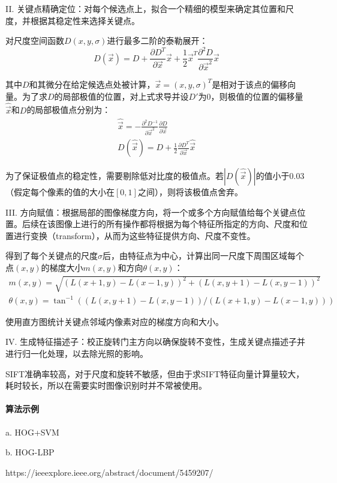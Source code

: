   II. 关键点精确定位：对每个候选点上，拟合一个精细的模型来确定其位置和尺度，并根据其稳定性来选择关键点。

  对尺度空间函数$D(x,y,\sigma)$进行最多二阶的泰勒展开：
$$D(\vec{x})=D+\frac{\partial D^T}{\partial \vec{x}}\vec{x}+\frac{1}{2}\vec{x}^T\frac{\partial^2D}{\partial\vec{x}^2}\vec{x}$$

  其中$D$和其微分在给定候选点处被计算，$\vec{x}=(x,y,\sigma)^T$是相对于该点的偏移向量。为了求$D$的局部极值的位置，对上式求导并设$D'$为0，则极值的位置的偏移量$\hat{\vec{x}}$和$D$的局部极值点分别为：
\begin{gather*}
\hat{\vec{x}}=-\frac{\partial^2 D^{-1}}{\partial \vec{x}^2}\frac{\partial D}{\partial \vec{x}}\\
D(\hat{\vec{x}})=D+\frac{1}{2} \frac{\partial D^T}{\partial \vec{x}} \hat{\vec{x}}
\end{gather*}

  为了保证极值点的稳定性，需要剔除低对比度的极值点。若$|D(\hat{\vec{x}})|$的值小于0.03（假定每个像素的值的大小在$[0,1]$之间），则将该极值点舍弃。

  III. 方向赋值：根据局部的图像梯度方向，将一个或多个方向赋值给每个关键点位置。后续在该图像上进行的所有操作都将根据为每个特征所指定的方向、尺度和位置进行变换（transform），从而为这些特征提供方向、尺度不变性。

  得到了每个关键点的尺度$\sigma$后，由特征点为中心，计算出同一尺度下周围区域每个点$(x,y)$的梯度大小$m(x,y)$和方向$\theta(x,y)$：
\begin{gather*}
m(x,y)=\sqrt{(L(x+1,y)-L(x-1,y))^2+(L(x,y+1)-L(x,y-1))^2}\\
\theta(x,y)=\tan^{-1}((L(x,y+1)-L(x,y-1))/(L(x+1,y)-L(x-1,y)))
\end{gather*}

  使用直方图统计关键点邻域内像素对应的梯度方向和大小。

  IV. 生成特征描述子：校正旋转门主方向以确保旋转不变性，生成关键点描述子并进行归一化处理，以去除光照的影响。

  SIFT准确率较高，对于尺度和旋转不敏感，但由于求SIFT特征向量计算量较大，耗时较长，所以在需要实时图像识别时并不常被使用。

\paragraph{算法示例}
  a. HOG+SVM

  b. HOG-LBP

  https://ieeexplore.ieee.org/abstract/document/5459207/


